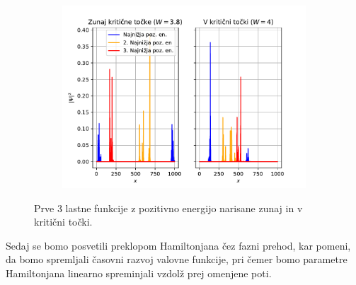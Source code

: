 \begin{figure}[H]
\centering
\begin{subfigure}{.7\textwidth}
\includegraphics[width=\linewidth]{Figures/EigenPloti.pdf}
\end{subfigure}
\caption{Prve 3 lastne funkcije z pozitivno energijo narisane zunaj in v kritični točki.}
\label{fig:EigenPloti}
\end{figure}

Sedaj se bomo posvetili preklopom Hamiltonjana čez fazni prehod, kar pomeni, da bomo spremljali časovni razvoj valovne funkcije, pri čemer bomo parametre Hamiltonjana linearno spreminjali vzdolž prej omenjene poti.

